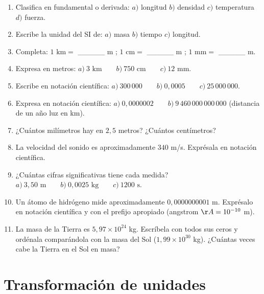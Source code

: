 \documentclass[12pt, letterpaper]{article}
\begin{document}
\begin{enumerate}[leftmargin=*, resume]
  \item \facil{} Clasifica en fundamental o derivada: $a)$ longitud \quad $b)$ densidad \quad $c)$ temperatura \quad $d)$ fuerza.

  \item \facil{} Escribe la unidad del SI de: $a)$ masa \quad $b)$ tiempo \quad $c)$ longitud.

  \item \facil{} Completa: $1 \text{ km} =$ \_\_\_\_\_ m \quad ; \quad $1 \text{ cm} =$ \_\_\_\_\_ m \quad ; \quad $1 \text{ mm} =$ \_\_\_\_\_ m.

  \item \facil{} Expresa en metros: $a)\ 3 \text{ km} \qquad b)\ 750 \text{ cm} \qquad c)\ 12 \text{ mm}$.

  \item \facil{} Escribe en notación científica: $a)\ 300\,000 \qquad b)\ 0{,}0005 \qquad c)\ 25\,000\,000$.

  \item \medio{} Expresa en notación científica: $a)\ 0{,}0000002 \qquad b)\ 9\,460\,000\,000\,000$ (distancia de un año luz en km).

  \item \medio{} ¿Cuántos milímetros hay en $2{,}5$ metros? ¿Cuántos centímetros?

  \item \medio{} La velocidad del sonido es aproximadamente $340$ m/s. Exprésala en notación científica.

  \item \medio{} ¿Cuántas cifras significativas tiene cada medida? $a)\ 3{,}50 \text{ m} \qquad b)\ 0{,}0025 \text{ kg} \qquad c)\ 1200 \text{ s}$.

  \item \dificil{} Un átomo de hidrógeno mide aproximadamente $0{,}0000000001$ m. Exprésalo en notación científica y con el prefijo apropiado (angstrom $\AA = 10^{-10}$ m).

  \item \dificil{} La masa de la Tierra es $5{,}97 \times 10^{24}$ kg. Escríbela con todos sus ceros y ordénala comparándola con la masa del Sol ($1{,}99 \times 10^{30}$ kg). ¿Cuántas veces cabe la Tierra en el Sol en masa?
\end{enumerate}

\section{Transformación de unidades}
\end{document}
